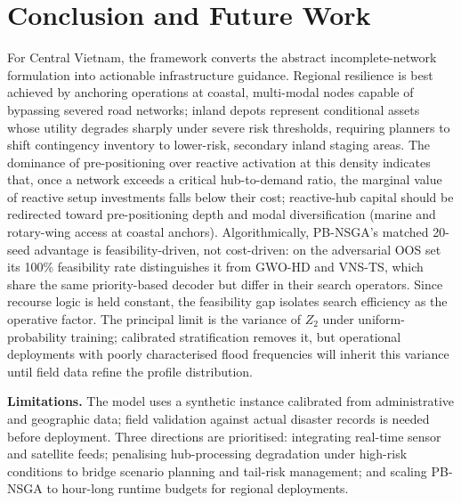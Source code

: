\documentclass{llncs}
\begin{document}
%

\section{Conclusion and Future Work}

For Central Vietnam, the framework converts the abstract incomplete-network formulation into actionable infrastructure guidance. Regional resilience is best achieved by anchoring operations at coastal, multi-modal nodes capable of bypassing severed road networks; inland depots represent conditional assets whose utility degrades sharply under severe risk thresholds, requiring planners to shift contingency inventory to lower-risk, secondary inland staging areas. The dominance of pre-positioning over reactive activation at this density indicates that, once a network exceeds a critical hub-to-demand ratio, the marginal value of reactive setup investments falls below their cost; reactive-hub capital should be redirected toward pre-positioning depth and modal diversification (marine and rotary-wing access at coastal anchors).
Algorithmically, PB-NSGA's matched 20-seed advantage is feasibility-driven, not cost-driven: on the adversarial OOS set its 100\% feasibility rate distinguishes it from GWO-HD and VNS-TS, which share the same priority-based decoder but differ in their search operators. Since recourse logic is held constant, the feasibility gap isolates search efficiency as the operative factor. The principal limit is the variance of $Z_2$ under uniform-probability training; calibrated stratification removes it, but operational deployments with poorly characterised flood frequencies will inherit this variance until field data refine the profile distribution.

\textbf{Limitations.}
The model uses a synthetic instance calibrated from administrative and geographic data; field validation against actual disaster records is needed before deployment. Three directions are prioritised: integrating real-time sensor and satellite feeds; penalising hub-processing degradation under high-risk conditions to bridge scenario planning and tail-risk management; and scaling PB-NSGA to hour-long runtime budgets for regional deployments.
\end{document}
